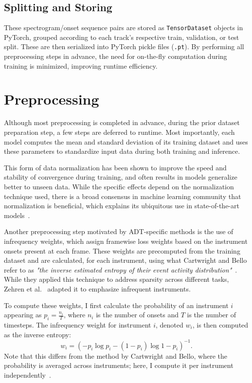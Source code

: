 \subsection{Splitting and Storing}

These spectrogram/onset sequence pairs are stored as \texttt{TensorDataset} objects in PyTorch, grouped according to each track's respective train, validation, or test split. These are then serialized into PyTorch pickle files (\texttt{.pt}). By performing all preprocessing steps in advance, the need for on-the-fly computation during training is minimized, improving runtime efficiency.

\section{Preprocessing}

Although most preprocessing is completed in advance, during the prior dataset preparation step, a few steps are deferred to runtime. Most importantly, each model computes the mean and standard deviation of its training dataset and uses these parameters to standardize input data during both training and inference. 

This form of data normalization has been shown to improve the speed and stability of convergence during training, and often results in models generalize better to unseen data. While the specific effects depend on the normalization technique used, there is a broad consensus in machine learning community that normalization is beneficial, which explains its ubiquitous use in state-of-the-art models~\cite{10056354}.

Another preprocessing step motivated by \gls{ADT}-specific methods is the use of infrequency weights, which assign framewise loss weights based on the instrument onsets present at each frame. These weights are precomputed from the training dataset and are calculated, for each instrument, using what Cartwright and Bello refer to as \textit{"the inverse estimated entropy of their event activity distribution"}~\cite{cartwright2018increasing}. While they applied this technique to address sparsity across different tasks, Zehren et al.~\cite{signals4040042} adapted it to emphasize infrequent instruments.

To compute these weights, I first calculate the probability of an instrument $i$ appearing as $p_i = \frac{n_i}{T}$, where $n_i$ is the number of onsets and $T$ is the number of timesteps. The infrequency weight for instrument $i$, denoted $w_i$, is then computed as the inverse entropy: \[w_i = \left(-p_i\log p_i - (1 - p_i)\log{1 - p_i}\right)^{-1}.\] Note that this differs from the method by Cartwright and Bello, where the probability is averaged across instruments; here, I compute it per instrument independently~\cite{cartwright2018increasing}. 

